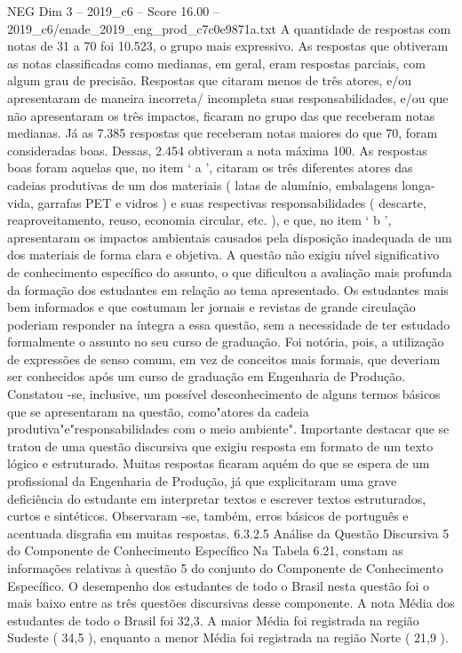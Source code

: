 \begin{textsample}{NEG Dim 3 – 2019\_c6 – Score 16.00 – 2019\_c6/enade\_2019\_eng\_prod\_c7c0e9871a.txt}
A quantidade de respostas com notas de 31 a 70 foi 10.523, o grupo mais expressivo.
As respostas que obtiveram as notas classificadas como medianas, em geral, eram respostas parciais, com algum grau de precisão.
Respostas que citaram menos de três atores, e/ou apresentaram de maneira incorreta/ incompleta suas responsabilidades, e/ou que não apresentaram os três impactos, ficaram no grupo das que receberam notas medianas.
Já as 7.385 respostas que receberam notas maiores do que 70, foram consideradas boas.
Dessas, 2.454 obtiveram a nota máxima 100.
As respostas boas foram aquelas que, no item ‘ a ’, citaram os três diferentes atores das cadeias produtivas de um dos materiais ( latas de alumínio, embalagens longa-vida, garrafas PET e vidros ) e suas respectivas responsabilidades ( descarte, reaproveitamento, reuso, economia circular, etc. ), e que, no item ‘ b ’, apresentaram os impactos ambientais causados pela disposição inadequada de um dos materiais de forma clara e objetiva.
A questão não exigiu nível significativo de conhecimento específico do assunto, o que dificultou a avaliação mais profunda da formação dos estudantes em relação ao tema apresentado.
Os estudantes mais bem informados e que costumam ler jornais e revistas de grande circulação poderiam responder na íntegra a essa questão, sem a necessidade de ter estudado formalmente o assunto no seu curso de graduação.
Foi notória, pois, a utilização de expressões de senso comum, em vez de conceitos mais formais, que deveriam ser conhecidos após um curso de graduação em Engenharia de Produção.
Constatou -se, inclusive, um possível desconhecimento de alguns termos básicos que se apresentaram na questão, como"atores da cadeia produtiva"e"responsabilidades com o meio ambiente".
Importante destacar que se tratou de uma questão discursiva que exigiu resposta em formato de um texto lógico e estruturado.
Muitas respostas ficaram aquém do que se espera de um profissional da Engenharia de Produção, já que explicitaram uma grave deficiência do estudante em interpretar textos e escrever textos estruturados, curtos e sintéticos.
Observaram -se, também, erros básicos de português e acentuada disgrafia em muitas respostas. 6.3.2.5 Análise da Questão Discursiva 5 do Componente de Conhecimento Específico Na Tabela 6.21, constam as informações relativas à questão 5 do conjunto do Componente de Conhecimento Específico.
O desempenho dos estudantes de todo o Brasil nesta questão foi o mais baixo entre as três questões discursivas desse componente.
A nota Média dos estudantes de todo o Brasil foi 32,3.
A maior Média foi registrada na região Sudeste ( 34,5 ), enquanto a menor Média foi registrada na região Norte ( 21,9 ).

\end{textsample}
